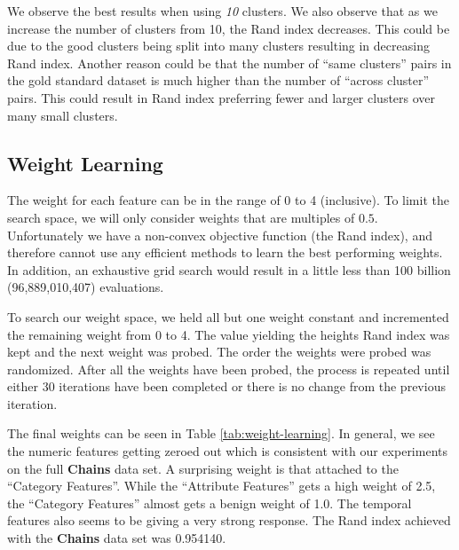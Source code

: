 \documentclass{article}
\begin{document}
         We observe the best results when using \textit{10} clusters.
         We also observe that as we increase the number of clusters from 10, the Rand index decreases.
         This could be due to the good clusters being split into many clusters resulting in decreasing Rand index.
         Another reason could be that the number of ``same clusters'' pairs in the gold standard dataset is much higher than the number of ``across cluster'' pairs.
         This could result in Rand index preferring fewer and larger clusters over many small clusters.

   \subsection{Weight Learning}
      The weight for each feature can be in the range of 0 to 4 (inclusive).
      To limit the search space, we will only consider weights that are multiples of $0.5$.
      Unfortunately we have a non-convex objective function (the Rand index), and therefore cannot use any efficient methods to learn the best performing weights.
      In addition, an exhaustive grid search would result in a little less than 100 billion (96,889,010,407) evaluations.

      To search our weight space, we held all but one weight constant and incremented the remaining weight from 0 to 4.
      The value yielding the heights Rand index was kept and the next weight was probed.
      The order the weights were probed was randomized.
      After all the weights have been probed, the process is repeated until either 30 iterations have been completed or there is no change from the previous iteration.

      The final weights can be seen in Table \ref{tab:weight-learning}.
      In general, we see the numeric features getting zeroed out which is consistent with our experiments on the full \textbf{Chains} data set.
      A surprising weight is that attached to the ``Category Features''.
      While the ``Attribute Features'' gets a high weight of 2.5, the ``Category Features'' almost gets a benign weight of 1.0.
      The temporal features also seems to be giving a very strong response.
      The Rand index achieved with the \textbf{Chains} data set was 0.954140.
\end{document}
